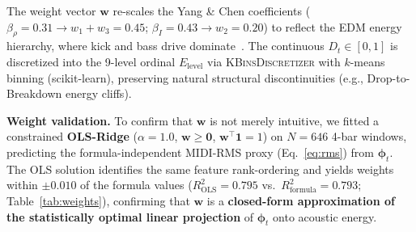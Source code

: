 \documentclass[conference]{IEEEtran}
\begin{document}
\begin{table}[ht]
\centering\small
\caption{Feature vector $\boldsymbol{\phi}_t$ in Eq.~\eqref{eq:energy}: definition, normalisation,
and Yang \& Chen~\cite{yang2012machine} counterpart.}
\label{tab:phi_features}
\end{table}

The weight vector $\boldsymbol{w}$ re-scales the Yang \& Chen coefficients
($\beta_{\rho}=0.31\to w_1+w_3=0.45$; $\beta_{I}=0.43\to w_2=0.20$)
to reflect the EDM energy hierarchy, where kick and bass drive dominate~\cite{zelechowski2021edm}.
The continuous $D_t\in[0,1]$ is discretized into the 9-level ordinal
$E_{\mathrm{level}}$ via \textsc{KBinsDiscretizer} with $k$-means binning (scikit-learn),
preserving natural structural discontinuities (e.g., Drop-to-Breakdown energy cliffs).

\textbf{Weight validation.}
To confirm that $\boldsymbol{w}$ is not merely intuitive, we fitted a constrained \textbf{OLS-Ridge} ($\alpha\!=\!1.0$, $\boldsymbol{w}\geq\mathbf{0}$, $\boldsymbol{w}^{\!\top}\mathbf{1}=1$) on $N=646$ 4-bar windows, predicting the formula-independent MIDI-RMS proxy (Eq.~\ref{eq:rms}) from $\boldsymbol{\phi}_t$.  The OLS solution identifies the same feature rank-ordering and yields weights within $\pm0.010$ of the formula values ($R^2_{\mathrm{OLS}}=0.795$ vs.\ $R^2_{\mathrm{formula}}=0.793$; Table~\ref{tab:weights}), confirming that $\boldsymbol{w}$ is a \textbf{closed-form approximation of the statistically optimal linear projection} of $\boldsymbol{\phi}_t$ onto acoustic energy.
\end{document}
